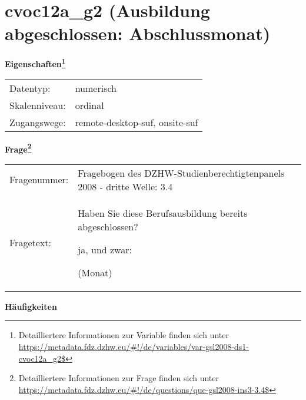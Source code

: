 
    \setcounter{footnote}{0}

    \vspace*{-1.8cm}
	\section{cvoc12a\_g2 (Ausbildung abgeschlossen: Abschlussmonat)}
	\label{section:cvoc12a_g2}



    \vspace*{0.5cm}
    \noindent\textbf{Eigenschaften\footnote{Detailliertere Informationen zur Variable finden sich unter
		\url{https://metadata.fdz.dzhw.eu/\#!/de/variables/var-gsl2008-ds1-cvoc12a_g2$}}}\\
	\begin{tabularx}{\hsize}{@{}lX}
	Datentyp: & numerisch \\
	Skalenniveau: & ordinal \\
	Zugangswege: &
	  remote-desktop-suf, 
	  onsite-suf
 \\
    \end{tabularx}



				\vspace*{0.5cm}
                \noindent\textbf{Frage\footnote{Detailliertere Informationen zur Frage finden sich unter
		              \url{https://metadata.fdz.dzhw.eu/\#!/de/questions/que-gsl2008-ins3-3.4$}}}\\
				\begin{tabularx}{\hsize}{@{}lX}
					Fragenummer: &
					  Fragebogen des DZHW-Studienberechtigtenpanels 2008 - dritte Welle:
					  3.4
 \\
					Fragetext: & Haben Sie diese Berufsausbildung bereits abgeschlossen?\par  ja, und zwar:\par  (Monat) \\
				\end{tabularx}





        		\vspace*{0.5cm}
                \noindent\textbf{Häufigkeiten}

